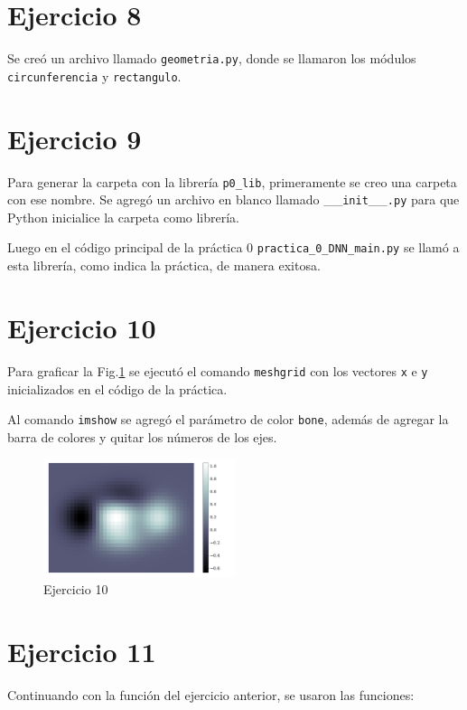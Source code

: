 \section*{Ejercicio 8}

Se creó un archivo llamado \verb|geometria.py|, donde se llamaron los módulos \verb|circunferencia| y \verb|rectangulo|.


\section*{Ejercicio 9}

Para generar la carpeta con la librería \verb|p0_lib|, primeramente se creo una carpeta con ese nombre. Se agregó un archivo en blanco llamado \_\_\verb|init|\_\_\verb|.py| para que Python inicialice la carpeta como librería.

Luego en el código principal de la práctica 0 \verb|practica_0_DNN_main.py| se llamó a esta librería, como indica la práctica, de manera exitosa.

\section*{Ejercicio 10}

Para graficar la Fig.\ref{fig:ejer10} se ejecutó el comando \verb|meshgrid| con  los vectores \verb|x| e \verb|y| inicializados en el código de la práctica. 

Al comando \verb|imshow| se agregó el parámetro de color \verb|bone|, además de agregar la barra de colores y quitar los números de los ejes.

\begin{figure}[H]
	\centering
	\includegraphics[width=0.5\textwidth]{ejer_10.pdf}
	\caption{Ejercicio 10}
	\label{fig:ejer10}
\end{figure}
	

\section*{Ejercicio 11}

Continuando con la función del ejercicio anterior, se usaron las funciones:

